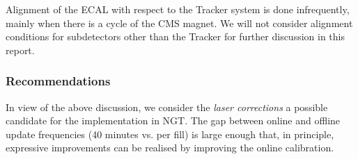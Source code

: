 Alignment of the ECAL with respect to the Tracker system is done infrequently,
mainly when there is a cycle of the CMS magnet.
We will not consider alignment conditions for subdetectors other than the Tracker for further discussion in this report.

\subsubsection{Recommendations}

In view of the above discussion, we consider the \emph{laser corrections} a possible candidate for the implementation in NGT.
The gap between online and offline update frequencies (40 minutes vs. per fill) is large enough that, in principle, expressive improvements can be realised by improving the online calibration.
